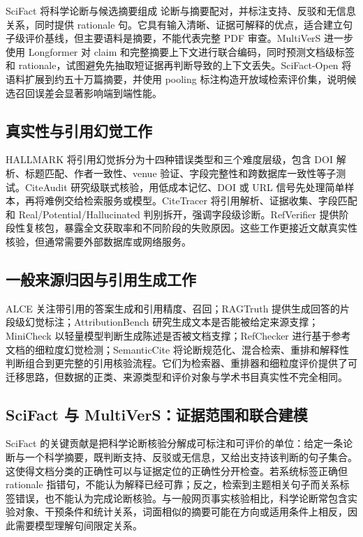 \documentclass[UTF8,a4paper,11pt]{ctexart}
\begin{document}
SciFact 将科学论断与候选摘要组成 论断与摘要配对，并标注支持、反驳和无信息关系，同时提供 rationale 句\cite{scifact}。它具有输入清晰、证据可解释的优点，适合建立句子级评价基线，但主要语料是摘要，不能代表完整 PDF 审查。MultiVerS 进一步使用 Longformer 对 claim 和完整摘要上下文进行联合编码，同时预测文档级标签和 rationale，试图避免先抽取短证据再判断导致的上下文丢失\cite{multivers}。SciFact-Open 将语料扩展到约五十万篇摘要，并使用 pooling 标注构造开放域检索评价集，说明候选召回误差会显著影响端到端性能\cite{scifactopen}。

\subsection{真实性与引用幻觉工作}

HALLMARK 将引用幻觉拆分为十四种错误类型和三个难度层级，包含 DOI 解析、标题匹配、作者一致性、venue 验证、字段完整性和跨数据库一致性等子测试\cite{hallmark}。CiteAudit 研究级联式核验，用低成本记忆、DOI 或 URL 信号先处理简单样本，再将难例交给检索服务或模型\cite{citeaudit}。CiteTracer 将引用解析、证据收集、字段匹配和 Real/Potential/Hallucinated 判别拆开，强调字段级诊断\cite{citetracer}。RefVerifier 提供阶段性复核包，暴露全文获取率和不同阶段的失败原因\cite{refverifier}。这些工作更接近文献真实性核验，但通常需要外部数据库或网络服务。

\subsection{一般来源归因与引用生成工作}

ALCE 关注带引用的答案生成和引用精度、召回\cite{alce}；RAGTruth 提供生成回答的片段级幻觉标注\cite{ragtruth}；AttributionBench 研究生成文本是否能被给定来源支撑\cite{attributionbench}；MiniCheck 以轻量模型判断生成陈述是否被文档支撑\cite{minicheck}；RefChecker 进行基于参考文档的细粒度幻觉检测\cite{refchecker}；SemanticCite 将论断规范化、混合检索、重排和解释性判断组合到更完整的引用核验流程\cite{semanticcite}。它们为检索器、重排器和细粒度评价提供了可迁移思路，但数据的正类、来源类型和评价对象与学术书目真实性不完全相同。

\subsection{SciFact 与 MultiVerS：证据范围和联合建模}

SciFact 的关键贡献是把科学论断核验分解成可标注和可评价的单位：给定一条论断与一个科学摘要，既判断支持、反驳或无信息，又给出支持该判断的句子集合\cite{scifact}。这使得文档分类的正确性可以与证据定位的正确性分开检查。若系统标签正确但 rationale 指错句，不能认为解释已经可靠；反之，检索到主题相关句子而关系标签错误，也不能认为完成论断核验。与一般网页事实核验相比，科学论断常包含实验对象、干预条件和统计关系，词面相似的摘要可能在方向或适用条件上相反，因此需要模型理解句间限定关系。
\end{document}
